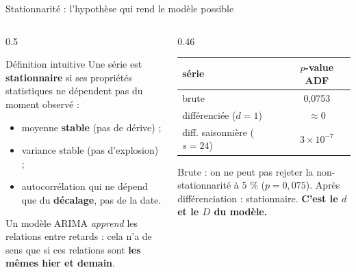 \begin{frame}{Stationnarité : l'hypothèse qui rend le modèle possible}
\begin{columns}[t]
\begin{column}{0.5\textwidth}
\begin{block}{Définition intuitive}
Une série est \textbf{stationnaire} si ses propriétés statistiques ne
dépendent pas du moment observé :
\begin{itemize}
\item moyenne \textbf{stable} (pas de dérive) ;
\item variance stable (pas d'explosion) ;
\item autocorrélation qui ne dépend que du \textbf{décalage}, pas de la date.
\end{itemize}
Un modèle ARIMA \emph{apprend} les relations entre retards : cela n'a de
sens que si ces relations sont \textbf{les mêmes hier et demain}.
\end{block}
\end{column}
\begin{column}{0.46\textwidth}
\begin{ebox}
\footnotesize
\begin{tabular}{@{}lc@{}}
\toprule
série & $p$-value ADF\\
\midrule
brute & 0,0753\\
différenciée ($d=1$) & $\approx 0$\\
diff. saisonnière ($s=24$) & $3\times10^{-7}$\\
\bottomrule
\end{tabular}
\end{ebox}
\begin{kbox}[Lecture]
Brute : on ne peut pas rejeter la non-stationnarité à 5 \% ($p = 0{,}075$).
Après différenciation : stationnaire. \textbf{C'est le $d$ et le $D$ du
modèle.}
\end{kbox}
\end{column}
\end{columns}
\end{frame}

